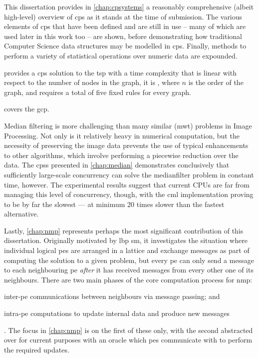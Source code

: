This dissertation provides in \cref{chap:cpsystems} a reasonably comprehensive (albeit high-level) overview of \gls{cps} as it stands at the time of submission.  The various elements of \gls{cps} that have been defined and are still in use -- many of which are used later in this work too -- are shown, before demonstrating how traditional Computer Science data structures may be modelled in \gls{cps}.  Finally, methods to perform a variety of statistical operations over numeric data are expounded.

 provides a \gls{cps} solution to the \gls{tsp} with a time complexity that is linear with respect to the number of nodes in the graph, \ie{} it is , where \(n\) is the order of the graph, and requires a total of five fixed rules for every graph.

 covers the \gls{gcp}.  

Median filtering is more challenging than many similar (\gls{mwt}) problems in Image Processing.  Not only is it relatively heavy in numerical computation, but the necessity of preserving the image data prevents the use of typical enhancements to other algorithms, which involve performing a piecewise reduction over the data.  The \glspl{cps} presented in \cref{chap:median} demonstrates conclusively that sufficiently large-scale concurrency can solve the \gls{medianfilter} problem in constant time, however.  The experimental results suggest that current CPUs are far from managing this level of concurrency, though, with the \gls{cml} implementation proving to be by far the slowest --- at minimum 20 times slower than the fastest alternative.

Lastly, \cref{chap:nmp} represents perhaps the most significant contribution of this dissertation.  Originally motivated by \gls{lbp} \gls{sm}, it investigates the situation where individual logical \glspl{pe} are arranged in a lattice and exchange messages as part of computing the solution to a given problem, but every \gls{pe} can only send a message to each neighbouring \gls{pe} \emph{after} it has received messages from every other one of its neighbours.  There are two main phases of the core computation process for \gls{nmp}:
\begin{inparaenum}[a)]
\item inter-\gls{pe} communications between neighbours via message passing; and
\item intra-\gls{pe} computations to update internal data and produce new messages
\end{inparaenum}.  The focus in \cref{chap:nmp} is on the first of these only, with the second abstracted over for current purposes with an oracle which \glspl{pe} communicate with to perform the required updates.

